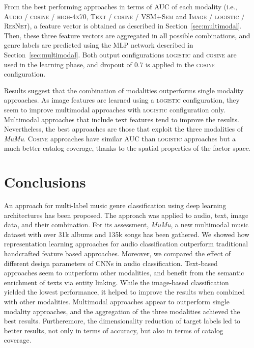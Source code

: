 \documentclass{article}
\begin{document}
From the best performing approaches in terms of AUC of each modality (i.e., \textsc{Audio} / \textsc{cosine} / \textsc{high-4x70}, \textsc{Text} / \textsc{cosine} / \textsc{VSM+Sem} and \textsc{Image} / \textsc{logistic} / \textsc{ResNet}), a feature vector is obtained as described in Section~\ref{sec:multimodal}. 
Then, these three feature vectors are aggregated in all possible combinations, and genre labels are predicted using the MLP network described in Section~\ref{sec:multimodal}.
Both output configurations \textsc{logistic} and \textsc{cosine} are used in the learning phase, and dropout of 0.7 is applied in the \textsc{cosine} configuration.


Results suggest that the combination of modalities outperforms single modality approaches. 
As image features are learned using a \textsc{logistic} configuration, they seem to improve multimodal approaches with \textsc{logistic} configuration only. 
Multimodal approaches that include text features tend to improve the results. Nevertheless, the best approaches are those that exploit the three modalities of \emph{MuMu}. \textsc{Cosine} approaches have similar AUC than \textsc{logistic} approaches but a much better catalog coverage, thanks to the spatial properties of the factor space. 



\section{Conclusions}\label{sec:conclusions}

An approach for multi-label music genre classification using deep learning architectures has been proposed. 
The approach was applied to audio, text, image data, and their combination. 
For its assessment, \emph{MuMu}, a new multimodal music dataset with over 31k albums and 135k songs has been gathered. 
We showed how representation learning approaches for audio classification outperform traditional handcrafted feature based approaches.
Moreover, we compared the effect of different design parameters of CNNs in audio classification. 
Text-based approaches seem to outperform other modalities, and benefit from the semantic enrichment of texts via entity linking. While the image-based classification yielded the lowest performance, it helped to improve the results when combined with other modalities.
Multimodal approaches appear to outperform single modality approaches, and the aggregation of the three modalities achieved the best results.
Furtheremore, the dimensionality reduction of target labels led to better results, not only in terms of accuracy, but also in terms of catalog coverage.
\end{document}
